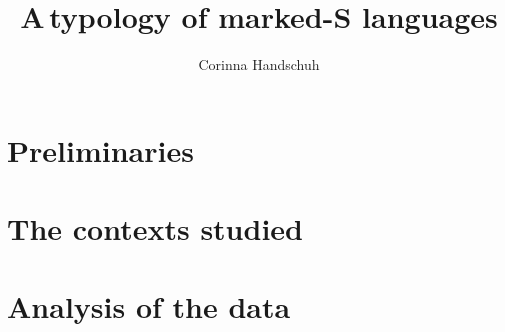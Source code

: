\documentclass[ number=1
			   ,series=sidl
				,url=http://langsci-press.org/catalog/book/18 
			   ,isbn=978-3-944675-19-0
			   ,output=long   %
			  ]{LSP/langsci}
\title{\hspace{1mm}A\,typology of marked-S languages}
\author{Corinna Handschuh}
\begin{document}
             
                                    
\maketitle  
 
\frontmatter 


\tableofcontents   





\mainmatter

\part{Preliminaries}





\part{The contexts studied}





	





\part{Analysis of the data}





\backmatter

\newpage
\end{document}
